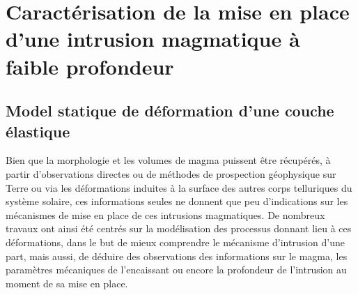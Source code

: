 \section{Caractérisation  de   la  mise  en  place   d'une  intrusion
  magmatique à faible profondeur}
\label{C1-sec:orign-theor-fram}

\subsection{Model statique de déformation d'une couche élastique}
\label{C1-sec:model-statique-de}

Bien  que  la  morphologie  et  les volumes  de  magma  puissent  être
récupérés,  à  partir  d'observations   directes  ou  de  méthodes  de
prospection géophysique sur  Terre ou via les  déformations induites à
la  surface  des autres  corps  telluriques  du système  solaire,  ces
informations  seules   ne  donnent  que  peu   d'indications  sur  les
mécanismes  de  mise  en  place de  ces  intrusions  magmatiques.   De
nombreux  travaux  ont  ainsi  été centrés  sur  la  modélisation  des
processus  donnant lieu  à  ces  déformations, dans  le  but de  mieux
comprendre le mécanisme d'intrusion d'une part, mais aussi, de déduire
des  observations  des  informations  sur  le  magma,  les  paramètres
mécaniques de l'encaissant  ou encore la profondeur  de l'intrusion au
moment de sa mise en place.

